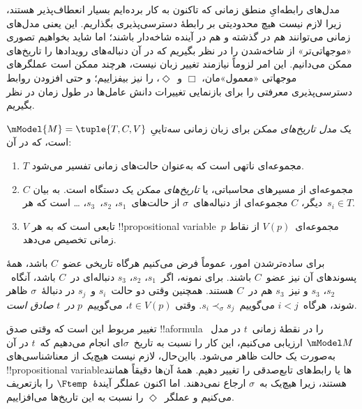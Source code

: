\documentclass[../../../include/open-logic-section]{subfiles}
\begin{document}


مدل‌های رابطه‌ایِ منطق زمانی که تاکنون به کار برده‌ایم بسیار انعطاف‌پذیر
هستند، زیرا لازم نیست هیچ محدودیتی بر رابطهٔ دسترسی‌پذیری بگذاریم. این
یعنی مدل‌های زمانی می‌توانند هم در گذشته و هم در آینده شاخه‌دار باشند؛
اما شاید بخواهیم تصوری «موجهاتی‌تر» از شاخه‌شدن را در نظر بگیریم که در
آن دنباله‌های رویدادها را تاریخ‌های ممکن می‌دانیم. این امر لزوماً
نیازمند تغییر زبان نیست، هرچند ممکن است عملگرهای موجهاتی «معمول»مان،
$\Box$ و~$\Diamond$، را نیز بیفزاییم؛ و حتی افزودن روابط دسترسی‌پذیری
معرفتی را برای بازنمایی تغییرات دانش عامل‌ها در طول زمان در نظر بگیریم.

\begin{defn}
  یک \emph{مدل تاریخ‌های ممکن} برای زبان زمانی سه‌تاییِ
  $\mModel{M} = \tuple{T, C, V}$ است، که در آن:
  \begin{enumerate}
    \item $T$ مجموعه‌ای ناتهی است که به‌عنوان حالت‌های زمانی تفسیر
      می‌شود.
    \item $C$ مجموعه‌ای از مسیرهای محاسباتی، یا \emph{تاریخ‌های ممکن}
      یک دستگاه است. به بیان دیگر، $C$ مجموعه‌ای از دنباله‌های~$\sigma$
      از حالت‌های~$s_1$، $s_2$،~$s_3$، \dots{} است که هر~$s_i \in T$.
    \item $V$ تابعی است که به هر !!{propositional variable}~$p$
      مجموعه‌ای~$V(p)$ از نقاط زمانی تخصیص می‌دهد.
  \end{enumerate}
  برای ساده‌ترشدن امور، عموماً فرض می‌کنیم هرگاه تاریخی عضو~$C$ باشد،
  همهٔ پسوندهای آن نیز عضو~$C$ باشند. برای نمونه، اگر~$s_1$، $s_2$،
  $s_3$ دنباله‌ای در~$C$ باشد، آنگاه~$s_2$، $s_3$ و نیز~$s_3$ هم
  در~$C$ هستند. همچنین وقتی دو حالت~$s_i$ و~$s_j$ در دنبالهٔ~$\sigma$
  ظاهر شوند، هرگاه~$i < j$ می‌گوییم~$s_i \prec_\sigma s_j$. وقتی
  $t \in V(p)$، می‌گوییم~$p$ \emph{در}~$t$ \emph{صادق است}.
\end{defn}

تغییر مربوط این است که وقتی صدق !!a{formula} را در نقطهٔ زمانی~$t$ در
مدل~$\mModel M$ ارزیابی می‌کنیم، این کار را نسبت به تاریخ~$\sigma$ای
انجام می‌دهیم که~$t$ در آن به‌صورت یک حالت ظاهر می‌شود. بااین‌حال،
لازم نیست هیچ‌یک از معناشناسی‌های !!{propositional variable}ها یا
رابط‌های تابع‌صدقی را تغییر دهیم. همهٔ آن‌ها دقیقاً همانند
 هستند، زیرا هیچ‌یک به~$\sigma$ ارجاع نمی‌دهند.
اما اکنون عملگر آیندهٔ~$\Ftemp$ را بازتعریف می‌کنیم و عملگر~$\Diamond$
را نسبت به این تاریخ‌ها می‌افزاییم.
\end{document}
